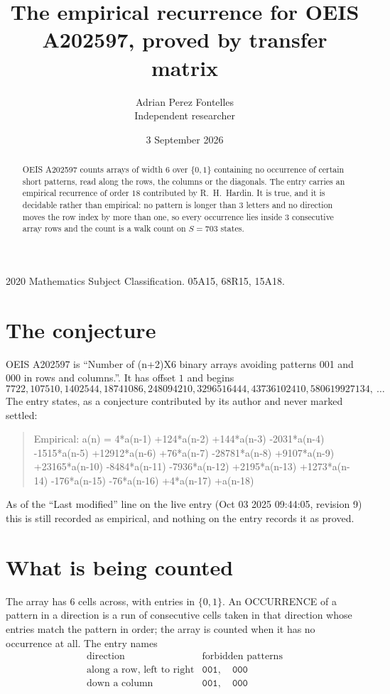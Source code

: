 \documentclass[11pt,a4paper]{article}
\title{The empirical recurrence for OEIS A202597, proved by transfer matrix}
\author{Adrian Perez Fontelles\\ \small Independent researcher}
\date{3 September 2026}
\theoremstyle{plain}
\theoremstyle{definition}
\begin{document}
\maketitle

\begin{abstract}
OEIS A202597 counts arrays of width $6$ over $\{0,1\}$ containing no occurrence of certain short
patterns, read along the rows, the columns or the diagonals. The entry carries an empirical
recurrence of order $18$ contributed by R.~H.~Hardin. It is true, and it is decidable
rather than empirical: no pattern is longer than $3$ letters and no direction moves the row
index by more than one, so every occurrence lies inside $3$ consecutive array rows and the
count is a walk count on $S=703$ states.
\end{abstract}

\noindent\small 2020 Mathematics Subject Classification. 05A15, 68R15, 15A18.\normalsize

\section{The conjecture}

OEIS A202597 is ``Number of (n+2)X6 binary arrays avoiding patterns 001 and 000 in rows and columns.''. It has offset $1$ and begins
\[
7722, 107510, 1402544, 18741086, 248094210, 3296516444, 43736102410, 580619927134,\ \dots
\]
The entry states, as a conjecture contributed by its author and never marked settled:
\begin{quote}
Empirical: a(n) = 4*a(n-1) +124*a(n-2) +144*a(n-3) -2031*a(n-4) -1515*a(n-5) +12912*a(n-6) +76*a(n-7) -28781*a(n-8) +9107*a(n-9) +23165*a(n-10) -8484*a(n-11) -7936*a(n-12) +2195*a(n-13) +1273*a(n-14) -176*a(n-15) -76*a(n-16) +4*a(n-17) +a(n-18)
\end{quote}
As of the ``Last modified'' line on the live entry (Oct 03 2025 09:44:05, revision 9) this is still
recorded as empirical, and nothing on the entry records it as proved.

\section{What is being counted}

The array has $6$ cells across, with entries in $\{0,1\}$. An OCCURRENCE of a pattern in a
direction is a run of consecutive cells taken in that direction whose entries match the pattern
in order; the array is counted when it has no occurrence at all. The entry names
\[
\begin{array}{ll}
\text{direction} & \text{forbidden patterns} \\[2pt]
\text{along a row, left to right} & \mathtt{001},\quad \mathtt{000} \\
\text{down a column} & \mathtt{001},\quad \mathtt{000} \\
\end{array}
\]
\end{document}
